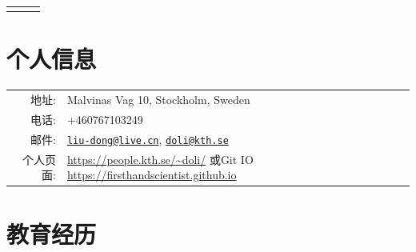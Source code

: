 \documentclass[a4paper,10pt]{article}
\begin{document}
\pagestyle{empty}


\begin{center}
  \begin{tabular}{lcr}
    \par{\centering{\Huge 刘栋, Ph.D.}\bigskip\par} & & %
  \end{tabular}
\end{center}

\section{个人信息}

\begin{tabular}{rl}
  \textsc{地址:} & Malvinas Vag 10, Stockholm, Sweden \\
  \textsc{电话:} & +460767103249 \\
  \textsc{邮件:} & \href{mailto:liu-dong@live.cn}{\nolinkurl{liu-dong@live.cn}}, \href{mailto:doli@kth.se}{\nolinkurl{doli@kth.se}} \\
  \textsc{个人页面:} & \href{https://people.kth.se/~doli/}{https://people.kth.se/{\textasciitilde}doli/} 或Git IO \href{https://firsthandscientist.github.io}{https://firsthandscientist.github.io}\\
\end{tabular}


\section{教育经历}
\end{document}
